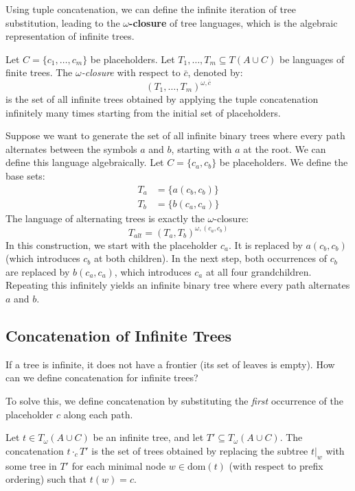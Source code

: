 Using tuple concatenation, we can define the infinite iteration of tree substitution, leading to the \textbf{$\omega$-closure} of tree languages, which is the algebraic representation of infinite trees.

\begin{definition}
Let $C = \{c_1, \dots, c_m\}$ be placeholders. Let $T_1, \dots, T_m \subseteq T(A \cup C)$ be languages of finite trees. The \emph{$\omega$-closure} with respect to $\bar{c}$, denoted by:
$$(T_1, \dots, T_m)^{\omega, \bar{c}}$$
is the set of all infinite trees obtained by applying the tuple concatenation infinitely many times starting from the initial set of placeholders.
\end{definition}

\begin{example}
Suppose we want to generate the set of all infinite binary trees where every path alternates between the symbols $a$ and $b$, starting with $a$ at the root. We can define this language algebraically.
Let $C = \{c_a, c_b\}$ be placeholders. We define the base sets:
\begin{align*}
    T_a &= \{ a(c_b, c_b) \} \\
    T_b &= \{ b(c_a, c_a) \}
\end{align*}
The language of alternating trees is exactly the $\omega$-closure:
$$T_{alt} = (T_a, T_b)^{\omega, (c_a, c_b)}$$
In this construction, we start with the placeholder $c_a$. It is replaced by $a(c_b, c_b)$ (which introduces $c_b$ at both children). In the next step, both occurrences of $c_b$ are replaced by $b(c_a, c_a)$, which introduces $c_a$ at all four grandchildren. Repeating this infinitely yields an infinite binary tree where every path alternates $a$ and $b$.
\end{example}

\subsection{Concatenation of Infinite Trees}
If a tree is infinite, it does not have a frontier (its set of leaves is empty). How can we define concatenation for infinite trees?

To solve this, we define concatenation by substituting the \emph{first} occurrence of the placeholder $c$ along each path.
\begin{definition}
Let $t \in T_\omega(A \cup C)$ be an infinite tree, and let $T' \subseteq T_\omega(A \cup C)$. The concatenation $t \cdot_c T'$ is the set of trees obtained by replacing the subtree $t|_w$ with some tree in $T'$ for each minimal node $w \in \text{dom}(t)$ (with respect to prefix ordering) such that $t(w) = c$.
\end{definition}

